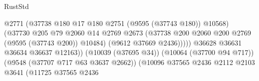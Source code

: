 \begin{lexlean}{RustStd}
\begin{coremodule}
                                                          @2771
                                                          (@37738
                                                            @180
                                                            @17
                                                            @180
                                                            @2751
                                                            (@9595 (@37743 @180))
                                                            @10568)
                                                          (@37730
                                                            @205
                                                            @79
                                                            @2060
                                                            @14
                                                            @2769
                                                            @2673
                                                            (@37738
                                                              @200
                                                              @2060
                                                              @200
                                                              @2769
                                                              (@9595 (@37743 @200))
                                                              @10484)
                                                            (@9612 @37669 @2436)))))
                                                    @36628
                                                    @36631
                                                    @36634
                                                    @36637
                                                    @12163))
                                                (@10039 (@37695 @34))
                                                (@10064 (@37700 @94 @717))
                                                (@9548 (@37707 @717 @63 @3637 @2662))
                                                (@10096
                                                  @37565
                                                  @2436
                                                  @2112
                                                  @2103
                                                  @3641
                                                  (@11725
                                                    @37565
                                                    @2436

\end{coremodule}
\end{lexlean}
